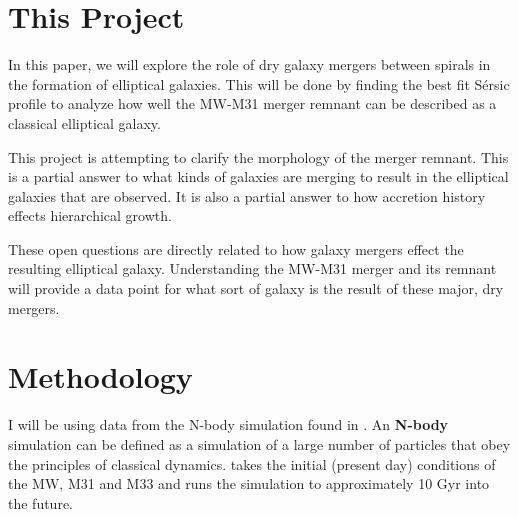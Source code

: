 \documentclass[fleqn,usenatbib]{mnras}
\begin{document}

\section{This Project}
In this paper, we will explore the role of dry galaxy mergers between spirals in the formation of elliptical galaxies. This will be done by finding the best fit S\'ersic profile to analyze how well the MW-M31 merger remnant can be described as a classical elliptical galaxy. 

This project is attempting to clarify the morphology of the merger remnant. This is a partial answer to what kinds of galaxies are merging to result in the elliptical galaxies that are observed. It is also a partial answer to how accretion history effects hierarchical growth. 

These open questions are directly related to how galaxy mergers effect the resulting elliptical galaxy. Understanding the MW-M31 merger and its remnant will provide a data point for what sort of galaxy is the result of these major, dry mergers. 

\section{Methodology}
I will be using data from the N-body simulation found in \citet{simulation}. An \textbf{N-body} simulation can be defined as 
a simulation of a large number of particles that obey the principles of classical dynamics. \citet{simulation} takes the initial (present day) conditions of the MW, M31 and M33 and runs the simulation to approximately 10 Gyr into the future. 
\end{document}
